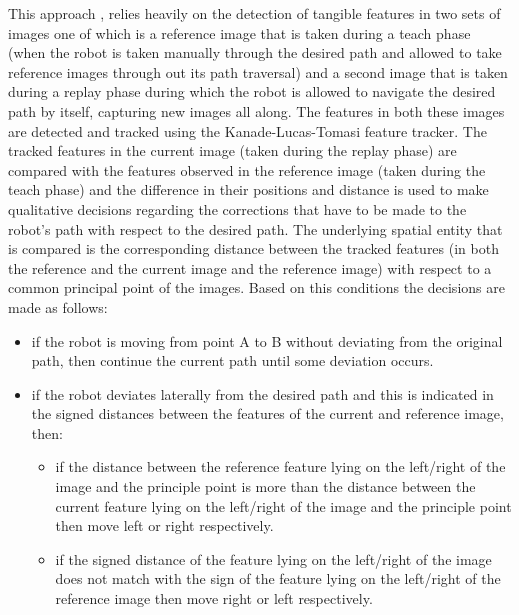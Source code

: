 	
	 This approach \cite{chen2006qualitative}, relies heavily on the detection of tangible features in two sets of images one of which is a reference image that is taken during a teach phase (when the robot is taken manually through the desired path and allowed to take reference images through out its path traversal) and a second image that is taken during a replay phase during which the robot is allowed to navigate the desired path by itself, capturing new images all along. The features in both these images are detected and tracked using the Kanade-Lucas-Tomasi \cite{birchfield2007klt} feature tracker. The tracked features in the current image (taken during the replay phase) are compared with the features observed in the reference image (taken during the teach phase) and the difference in their positions and distance is used to make qualitative decisions regarding the corrections that have to be made to the robot's path with respect to the desired path.
	The underlying spatial entity that is compared is the corresponding distance between the tracked features (in both the reference and the current image and the reference image) with respect to a common principal point of the images. Based on this conditions the decisions are made as follows:
	\begin{itemize}
		\item if the robot is moving from point A to B without deviating from the original path, then continue the current path until some deviation occurs.
		\item if the robot deviates laterally from the desired path and this is indicated in the signed distances between the features of the current and reference image, then:
		\begin{itemize}
			\item if the distance between the reference feature lying on the left/right of the image and the principle point is more than the distance between the current feature lying on the left/right of the image and the principle point then move left or right respectively.
			\item if the signed distance of the feature lying on the left/right of the image does not match with the sign of the feature lying on the left/right of the reference image then move right or left respectively.
		\end{itemize}
	\end{itemize} 
